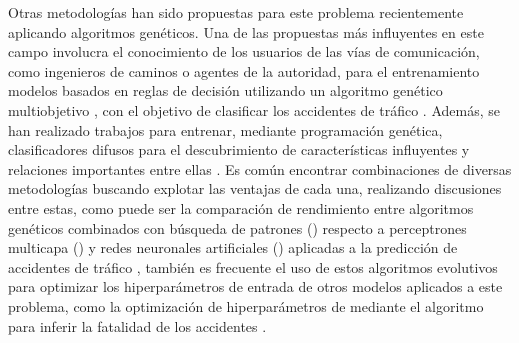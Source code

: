 Otras metodologías han sido propuestas para este problema recientemente aplicando algoritmos genéticos. Una de las propuestas más influyentes en este campo involucra el conocimiento de los usuarios de las vías de comunicación, como ingenieros de caminos o agentes de la autoridad, para el entrenamiento modelos basados en reglas de decisión utilizando un algoritmo genético multiobjetivo , con el objetivo de clasificar los accidentes de tráfico \cite{NSGAIIAccidentPrediction}. Además, se han realizado trabajos para entrenar, mediante programación genética, clasificadores difusos para el descubrimiento de características influyentes y relaciones importantes entre ellas \cite{GeneticProgrammingAccidents}. Es común encontrar combinaciones de diversas metodologías buscando explotar las ventajas de cada una, realizando discusiones entre estas, como puede ser la comparación de rendimiento entre algoritmos genéticos combinados con búsqueda de patrones () respecto a perceptrones multicapa () y redes neuronales artificiales () aplicadas a la predicción de accidentes de tráfico \cite{GAPSMLPANNAccidents}, también es frecuente el uso de estos algoritmos evolutivos para optimizar los hiperparámetros de entrada de otros modelos aplicados a este problema, como la optimización de hiperparámetros de  mediante el algoritmo  para inferir la fatalidad de los accidentes \cite{SVMPSOAccidents}.


